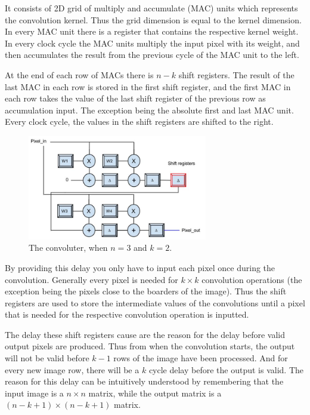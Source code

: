 It consists of 2D grid of multiply and accumulate (MAC) units which represents the convolution kernel. Thus the grid dimension is equal to the kernel dimension. In every MAC unit there is a register that contains the respective kernel weight. In every clock cycle the MAC units multiply the input pixel with its weight, and then accumulates the result from the previous cycle of the MAC unit to the left. 

At the end of each row of MACs there is $ n - k $ shift registers. The result of the last MAC in each row is stored in the first shift register, and the first MAC in each row takes the value of the last shift register of the previous row as accumulation input. The exception being the absolute first and last MAC unit. Every clock cycle, the values in the shift registers are shifted to the right. 

\begin{figure}[h!]
  \centering
      \includegraphics[width=0.7\textwidth]{Figures/Method/Convolver}
  \caption[The convoluter ]{The convoluter, when $ n = 3 $ and $ k = 2 $.}
\end{figure}
	
By providing this delay you only have to input each pixel once during the convolution. Generally every pixel is needed for $ k \times k $ convolution operations (the exception being the pixels close to the boarders of the image). Thus the shift registers are used to store the intermediate values of the convolutions until a pixel that is needed for the respective convolution operation is inputted. 

The delay these shift registers cause are the reason for the delay before valid output pixels are produced. Thus from when the convolution starts, the output will not be valid before $ k-1 $ rows of the image have been processed. And for every new image row, there will be a $ k $ cycle delay before the output is valid. The reason for this delay can be intuitively understood by remembering that the input image is a $ n \times n $ matrix, while the output matrix is a $ (n-k+1) \times (n-k+1) $ matrix. 

